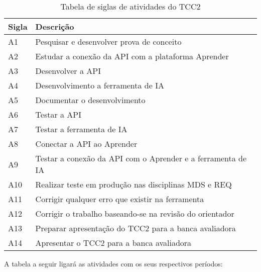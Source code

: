 \begin{table}[!ht]
\centering
\begin{tabularx}{\textwidth}{|X|X|}
\hline
\textbf{Sigla} & \textbf{Descrição} \\
\hline
A1 & Pesquisar e desenvolver prova de conceito \\ \hline
A2 & Estudar a conexão da API com a plataforma Aprender \\\hline
A3 & Desenvolver a API \\\hline
A4 & Desenvolvimento a ferramenta de IA \\\hline
A5 & Documentar o desenvolvimento \\\hline
A6 & Testar a API \\\hline
A7 & Testar a ferramenta de IA \\\hline
A8 & Conectar a API ao Aprender \\\hline
A9 & Testar a conexão da API com o Aprender e a ferramenta de IA \\\hline
A10 & Realizar teste em produção nas disciplinas MDS e REQ \\\hline
A11 & Corrigir qualquer erro que existir na ferramenta \\\hline
A12 & Corrigir o trabalho baseando-se na revisão do orientador \\\hline
A13 & Preparar apresentação do TCC2 para a banca avaliadora \\\hline
A14 & Apresentar o TCC2 para a banca avaliadora \\\hline
\end{tabularx}
\caption{Tabela de siglas de atividades do TCC2}
\end{table}

\pagebreak

A tabela a seguir ligará as atividades com os seus respectivos períodos:


